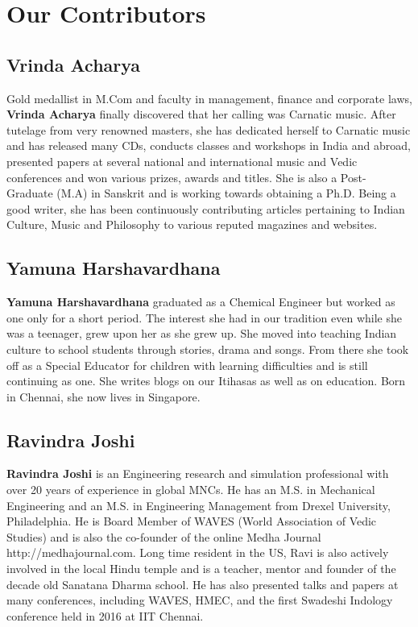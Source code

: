 
\chapter*{Our Contributors }\label{contributors}

\section*{Vrinda Acharya}

Gold medallist in M.Com and faculty in management, finance and corporate laws, \textbf{Vrinda Acharya} finally discovered that her calling was Carnatic music. After tutelage from very renowned masters, she has dedicated herself to Carnatic music and has released many CDs, conducts classes and workshops in India and abroad, presented papers at several national and international music and Vedic conferences and won various prizes, awards and titles. She is also a Post- Graduate (M.A) in Sanskrit and is working towards obtaining a Ph.D. Being a good writer, she has been continuously contributing articles pertaining to Indian Culture, Music and Philosophy to various reputed magazines and websites. 

\section*{Yamuna Harshavardhana}

\textbf{Yamuna Harshavardhana} graduated as a Chemical Engineer but worked as one only for a short period. The interest she had in our tradition even while she was a teenager, grew upon her as she grew up. She moved into teaching Indian culture to school students through stories, drama and songs. From there she took off as a Special Educator for children with learning difficulties and is still continuing as one. She writes blogs on our Itihasas as well as on education. Born in Chennai, she now lives in Singapore.

\newpage

\section*{Ravindra Joshi}

\textbf{Ravindra Joshi} is an Engineering research and simulation professional with over 20 years of experience in global MNCs. He has an M.S. in Mechanical Engineering and an M.S. in Engineering Management from Drexel University, Philadelphia. He is Board Member of WAVES (World Association of Vedic Studies) and is also the co-founder of the online Medha Journal http://medhajournal.com. Long time resident in the US, Ravi is also actively involved in the local Hindu temple and is a teacher, mentor and founder of the decade old Sanatana Dharma school. He has also presented talks and papers at many conferences, including WAVES, HMEC, and the first Swadeshi Indology conference held in 2016 at IIT Chennai.

